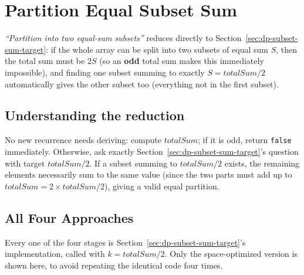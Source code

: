 \section{Partition Equal Subset Sum}
\label{sec:dp-partition-equal-subset}


\begin{patternbox}
\emph{``Partition into two equal-sum subsets''} reduces directly to
Section~\ref{sec:dp-subset-sum-target}: if the whole array can be split
into two subsets of equal sum $S$, then the total sum must be $2S$ (so
an \textbf{odd} total sum makes this immediately impossible), and finding
one subset summing to exactly $S = \textit{totalSum}/2$ automatically
gives the other subset too (everything not in the first subset).
\end{patternbox}

\subsection*{Understanding the reduction}

No new recurrence needs deriving: compute $\textit{totalSum}$; if it is
odd, return \texttt{false} immediately. Otherwise, ask exactly
Section~\ref{sec:dp-subset-sum-target}'s question with target
$\textit{totalSum}/2$. If a subset summing to $\textit{totalSum}/2$
exists, the remaining elements necessarily sum to the same value
(since the two parts must add up to $\textit{totalSum} =
2 \times \textit{totalSum}/2$), giving a valid equal partition.

\subsection*{All Four Approaches}

Every one of the four stages is Section~\ref{sec:dp-subset-sum-target}'s
implementation, called with $k = \textit{totalSum}/2$. Only the
space-optimized version is shown here, to avoid repeating the identical
code four times.

